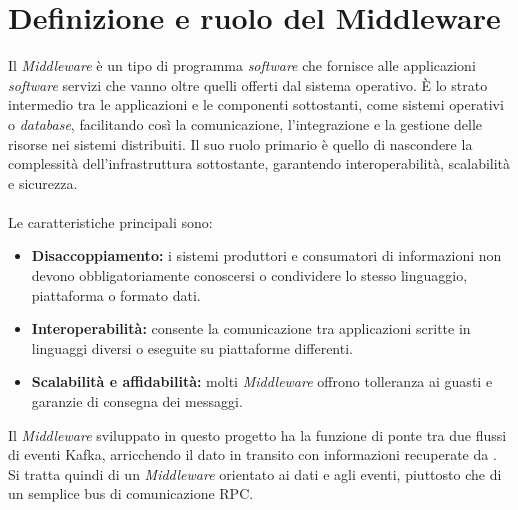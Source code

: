 \section{Definizione e ruolo del Middleware}
Il \textit{Middleware} è un tipo di programma \textit{software} che fornisce alle applicazioni \textit{software} servizi che vanno oltre quelli offerti dal sistema operativo.
È lo strato intermedio tra le applicazioni e le componenti sottostanti, come sistemi operativi o \textit{database}, facilitando così la comunicazione, l'integrazione e la gestione delle risorse nei sistemi distribuiti. 
Il suo ruolo primario è quello di nascondere la complessità dell'infrastruttura sottostante, garantendo interoperabilità, scalabilità e sicurezza. \\ \\
Le caratteristiche principali sono:
\begin{itemize}
    \item \textbf{Disaccoppiamento:} i sistemi produttori e consumatori di informazioni non devono obbligatoriamente conoscersi o condividere lo stesso linguaggio, piattaforma o formato dati.
    \item \textbf{Interoperabilità:} consente la comunicazione tra applicazioni scritte in linguaggi diversi o eseguite su piattaforme differenti.
    \item \textbf{Scalabilità e affidabilità:} molti \textit{Middleware} offrono tolleranza ai guasti e garanzie di consegna dei messaggi.
\end{itemize}
Il \textit{Middleware} sviluppato in questo progetto ha la funzione di ponte tra due flussi di eventi Kafka, arricchendo il dato in transito con informazioni recuperate da . 
Si tratta quindi di un \textit{Middleware} orientato ai dati e agli eventi, piuttosto che di un semplice bus di comunicazione \acrshort{RPC}.

